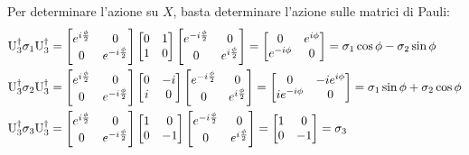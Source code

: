 Per determinare l'azione su $ X $, basta determinare l'azione sulle matrici di Pauli:
\begin{equation*}
	\begin{split}
	\mathrm{U}_3^{\dagger} \sigma_1 \mathrm{U}_3^{\dagger} &=
	\begin{bmatrix}
		e^{i \frac{\phi}{2}} & 0 \\ 0 & e^{-i \frac{\phi}{2}}
	\end{bmatrix}
	\begin{bmatrix}
		0 & 1 \\ 1 & 0
	\end{bmatrix}
	\begin{bmatrix}
		e^{-i \frac{\phi}{2}} & 0 \\ 0 & e^{i \frac{\phi}{2}}
	\end{bmatrix}
	=
	\begin{bmatrix}
		0 & e^{i\phi} \\ e^{-i\phi} & 0
	\end{bmatrix}
	= \sigma_1 \cos \phi - \sigma_2 \sin \phi \\
	\mathrm{U}_3^{\dagger} \sigma_2 \mathrm{U}_3^{\dagger} &=
	\begin{bmatrix}
		e^{i \frac{\phi}{2}} & 0 \\ 0 & e^{-i \frac{\phi}{2}}
	\end{bmatrix}
	\begin{bmatrix}
		0 & -i \\ i & 0
	\end{bmatrix}
	\begin{bmatrix}
		e^{-i \frac{\phi}{2}} & 0 \\ 0 & e^{i \frac{\phi}{2}}
	\end{bmatrix}
	=
	\begin{bmatrix}
		0 & -i e^{i\phi} \\ i e^{-i\phi} & 0
	\end{bmatrix}
	= \sigma_1 \sin \phi + \sigma_2 \cos \phi \\
	\mathrm{U}_3^{\dagger} \sigma_3 \mathrm{U}_3^{\dagger} &=
	\begin{bmatrix}
		e^{i \frac{\phi}{2}} & 0 \\ 0 & e^{-i \frac{\phi}{2}}
	\end{bmatrix}
	\begin{bmatrix}
		1 & 0 \\ 0 & -1
	\end{bmatrix}
	\begin{bmatrix}
		e^{-i \frac{\phi}{2}} & 0 \\ 0 & e^{i \frac{\phi}{2}}
	\end{bmatrix}
	=
	\begin{bmatrix}
		1 & 0 \\ 0 & -1
	\end{bmatrix}
	= \sigma_3
	\end{split}
\end{equation*}
